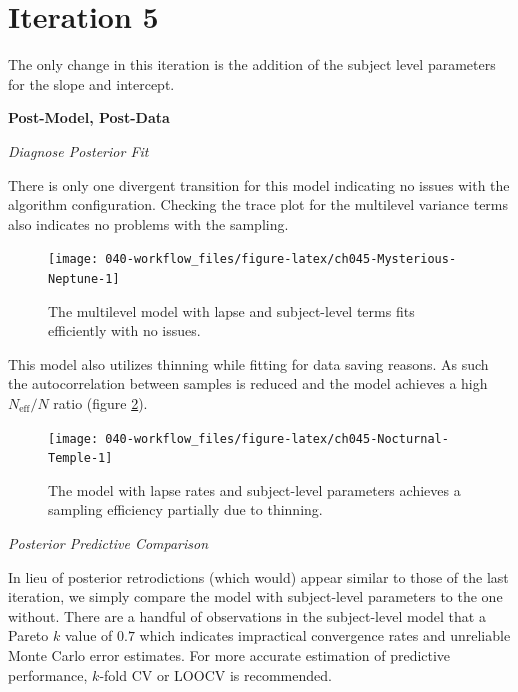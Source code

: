 \documentclass[11pt, oneside, openany]{scrbook}
\begin{document}
\hypertarget{iter5}{%
\section{Iteration 5}\label{iter5}}

The only change in this iteration is the addition of the subject level parameters for the slope and intercept.

\textbf{Post-Model, Post-Data}

\emph{Diagnose Posterior Fit}

There is only one divergent transition for this model indicating no issues with the algorithm configuration. Checking the trace plot for the multilevel variance terms also indicates no problems with the sampling.

\begin{figure}

{\centering \texttt{[image: 040-workflow\_files/figure-latex/ch045-Mysterious-Neptune-1]} 

}

\caption{The multilevel model with lapse and subject-level terms fits efficiently with no issues.}\label{fig:ch045-Mysterious-Neptune}
\end{figure}

This model also utilizes thinning while fitting for data saving reasons. As such the autocorrelation between samples is reduced and the model achieves a high \(N_{\mathrm{eff}}/N\) ratio (figure \ref{fig:ch045-Nocturnal-Temple}).

\begin{figure}

{\centering \texttt{[image: 040-workflow\_files/figure-latex/ch045-Nocturnal-Temple-1]} 

}

\caption{The model with lapse rates and subject-level parameters achieves a sampling efficiency partially due to thinning.}\label{fig:ch045-Nocturnal-Temple}
\end{figure}

\emph{Posterior Predictive Comparison}

In lieu of posterior retrodictions (which would) appear similar to those of the last iteration, we simply compare the model with subject-level parameters to the one without. There are a handful of observations in the subject-level model that a Pareto \(k\) value of \(0.7\) which indicates impractical convergence rates and unreliable Monte Carlo error estimates. For more accurate estimation of predictive performance, \(k\)-fold CV or LOOCV is recommended.
\end{document}
